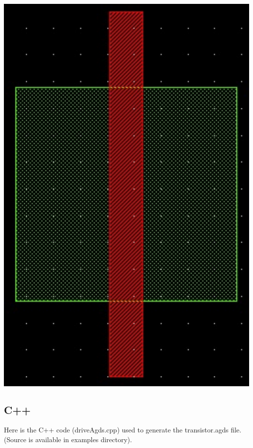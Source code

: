  
\begin{DoxyImage}
\includegraphics[width=.25\linewidth]{transistorCif}
\end{DoxyImage}
\hypertarget{agds_agdsC}{}\subsection{C++}\label{agds_agdsC}
Here is the C++ code ({\ttfamily drive\+Agds.\+cpp}) used to generate the transistor.\+agds file. (Source is available in examples directory). 
